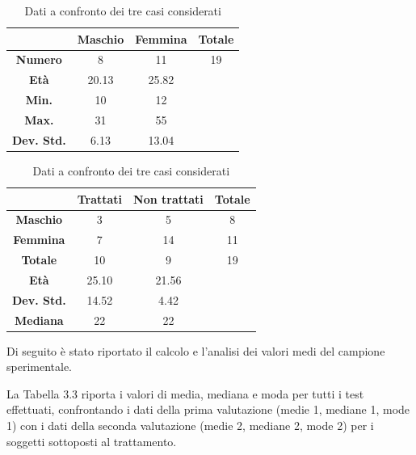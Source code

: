 \begin{table}[H]
\begin{center}
\begin{tabular}{|c|c|c|c|} \hline
{\textbf{}} & {\textbf{Maschio}} & {\textbf{Femmina}}& {\textbf{Totale}}\\ \hline
\textbf{Numero} & 8 & 11 & 19 \\ 
\textbf{Età} & 20.13 & 25.82 & \\ 
\textbf{Min.} & 10 & 12 &  \\ 
\textbf{Max.} & 31 & 55 &\\ 
\textbf{Dev. Std.} & 6.13 & 13.04 &\\

\hline
\end{tabular}
\end{center}
\caption{Dati a confronto dei tre casi considerati}
\end{table}


\begin{table}[H]
\begin{center}
\begin{tabular}{|c|c|c|c|} \hline
{\textbf{}} & {\textbf{Trattati}} & {\textbf{Non trattati}}& {\textbf{Totale}}\\ \hline
\textbf{Maschio} & 3 & 5 & 8 \\
\textbf{Femmina} & 7 & 14 & 11\\ 
\textbf{Totale} & 10 & 9 & 19 \\ 
\textbf{Età} & 25.10 & 21.56 &\\ 
\textbf{Dev. Std.} & 14.52 & 4.42 &\\
\textbf{Mediana} & 22 & 22 &\\

\hline
\end{tabular}
\end{center}
\caption{Dati a confronto dei tre casi considerati}
\end{table}

Di seguito è stato riportato il calcolo e l’analisi dei valori medi del campione sperimentale.

La Tabella 3.3 riporta i valori di media, mediana e moda per tutti i test effettuati, confrontando i dati della prima valutazione (medie 1, mediane 1, mode 1) con i dati della seconda valutazione (medie 2, mediane 2, mode 2) per i soggetti sottoposti al trattamento.


